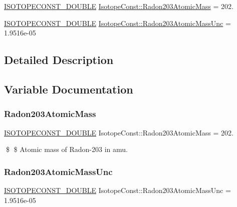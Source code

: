 \begin{DoxyCompactItemize}
\item 
\mbox{\hyperlink{group___isotope_const-_macros_ga8f45a7272ce02c0b4c65c44636ed719a}{I\+S\+O\+T\+O\+P\+E\+C\+O\+N\+S\+T\+\_\+\+D\+O\+U\+B\+LE}} \mbox{\hyperlink{group___isotope_const-_radon-_rn203_gad4732759ef173096de262bfc0e996bf1}{Isotope\+Const\+::\+Radon203\+Atomic\+Mass}} = 202.
\item 
\mbox{\hyperlink{group___isotope_const-_macros_ga8f45a7272ce02c0b4c65c44636ed719a}{I\+S\+O\+T\+O\+P\+E\+C\+O\+N\+S\+T\+\_\+\+D\+O\+U\+B\+LE}} \mbox{\hyperlink{group___isotope_const-_radon-_rn203_ga5f613f90f980621c4692b4a85f2d4470}{Isotope\+Const\+::\+Radon203\+Atomic\+Mass\+Unc}} = 1.\+9516e-\/05
\end{DoxyCompactItemize}


\subsection{Detailed Description}


\subsection{Variable Documentation}
\mbox{\label{group___isotope_const-_radon-_rn203_gad4732759ef173096de262bfc0e996bf1}} 
\subsubsection{\texorpdfstring{Radon203\+Atomic\+Mass}{Radon203AtomicMass}}
{\footnotesize\ttfamily \mbox{\hyperlink{group___isotope_const-_macros_ga8f45a7272ce02c0b4c65c44636ed719a}{I\+S\+O\+T\+O\+P\+E\+C\+O\+N\+S\+T\+\_\+\+D\+O\+U\+B\+LE}} Isotope\+Const\+::\+Radon203\+Atomic\+Mass = 202.}

\$ \$ Atomic mass of Radon-\/203 in amu. \mbox{\label{group___isotope_const-_radon-_rn203_ga5f613f90f980621c4692b4a85f2d4470}} 
\subsubsection{\texorpdfstring{Radon203\+Atomic\+Mass\+Unc}{Radon203AtomicMassUnc}}
{\footnotesize\ttfamily \mbox{\hyperlink{group___isotope_const-_macros_ga8f45a7272ce02c0b4c65c44636ed719a}{I\+S\+O\+T\+O\+P\+E\+C\+O\+N\+S\+T\+\_\+\+D\+O\+U\+B\+LE}} Isotope\+Const\+::\+Radon203\+Atomic\+Mass\+Unc = 1.\+9516e-\/05}

